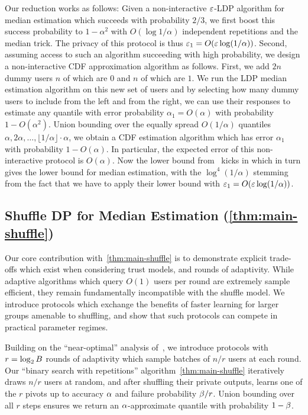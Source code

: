 Our reduction works as follows: Given a non-interactive $\varepsilon$-LDP algorithm for median estimation which succeeds with probability $2/3$, we first boost this success probability to $1-\alpha^2$ with $O(\log 1/\alpha)$ independent repetitions and the median trick. The privacy of this protocol is thus $\varepsilon_1=O(\varepsilon\log(1/\alpha))$. Second, assuming access to such an algorithm succeeding with high probability, we design a non-interactive CDF approximation algorithm as follows. First, we add $2n$ dummy users $n$ of which are $0$ and $n$ of which are $1$. We run the LDP median estimation algorithm on this new set of users and by selecting how many dummy users to include from the left and from the right, we can use their responses to estimate any quantile with error probability $\alpha_1=O(\alpha)$ with probability $1-O(\alpha^2)$. Union bounding over the equally spread $O(1/\alpha)$ quantiles $\alpha,2\alpha,\dots, \lfloor 1/\alpha\rfloor\cdot \alpha$, we obtain a CDF estimation algorithm which has error $\alpha_1$ with probability $1-O(\alpha)$. In particular, the expected error of this non-interactive protocol is $O(\alpha)$. Now the lower bound from~\cite{edmondsNU20} kicks in which in turn gives the lower bound for median estimation, with the $\log^4(1/\alpha)$ stemming from the fact that we have to apply their lower bound with $\varepsilon_1=O(\varepsilon\log(1/\alpha))$.

\subsection{Shuffle DP for Median Estimation (\cref{thm:main-shuffle})}
Our core contribution with~\cref{thm:main-shuffle} is to demonstrate explicit trade-offs which exist when considering trust models, and rounds of adaptivity. While adaptive algorithms which query $O(1)$ users per round are extremely sample efficient, they remain fundamentally incompatible with the shuffle model. We introduce protocols which exchange the benefits of faster learning for larger groups amenable to shuffling, and show that such protocols can compete in practical parameter regimes.

Building on the ``near-optimal'' analysis of~\cite{feldman21shuffle}, we introduce protocols with $r=\log_2B$ rounds of adaptivity which sample batches of $n/r$ users at each round. Our ``binary search with repetitions'' algorithm~\cref{thm:main-shuffle} iteratively draws $n/r$ users at random, and after shuffling their private outputs, learns one of the $r$ pivots up to accuracy $\alpha$ and failure probability $\beta/r$. Union bounding over all $r$ steps ensures we return an $\alpha$-approximate quantile with probability $1-\beta$. 

